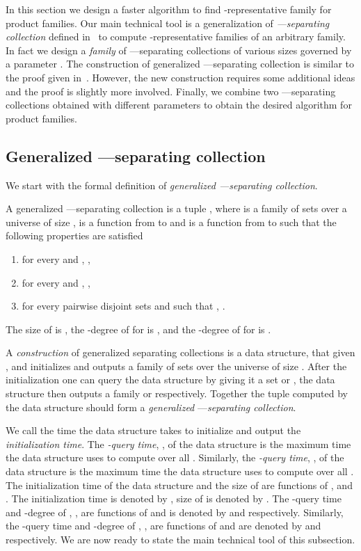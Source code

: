 



In this section we design a faster algorithm to find -representative family for product families. Our main technical tool is a generalization of {\em ---separating collection} defined in~\cite{FominLS13} to compute  -representative families of an arbitrary family. In fact we design a {\em family} of ---separating collections of various sizes governed by a parameter .  The construction of generalized ---separating collection  is similar to the proof given in~\cite{FominLS13}. However, the new construction  requires some additional ideas and the proof is slightly more involved. Finally, we combine two ---separating collections obtained with different parameters to obtain the desired algorithm for product families. 

\subsection{Generalized ---separating collection}

We start with the formal definition of {\em generalized ---separating collection}.

\begin{definition}
\label{def:twincollection}
A generalized ---separating collection  is a tuple , where  is a family of sets over a universe  of size ,  is a function from 
 to  and  is a function from  to  such that the following properties are satisfied
\begin{enumerate}
 \item for every  and , ,
 \item for every  and , , 
 \item for every pairwise disjoint sets  and  such that , 
.
\end{enumerate}
The size of   is , the -degree of  for  is , 
and the -degree of  for  is . 
\end{definition}




A {\em construction} of generalized separating collections is a data structure, that given ,  and  initializes and outputs a family  of sets over the universe  of size . 
After the initialization one can query the data structure by giving it a set   or , the data structure 
then outputs a family   or  respectively. Together the tuple  computed by the data structure 
should form a {\em generalized} ---{\em separating collection}.

We call the time the data structure takes to initialize and output  the {\em initialization time}. 
The {\em -query time}, , of the data structure is the maximum time the data structure uses to compute  over all . Similarly, the 
{\em -query time}, , of the data structure is the maximum time the data structure uses to compute  over all .
The initialization time of the data structure and the size of  are functions of  ,  and . The initialization time is denoted by 
, size of  is denoted by . The -query time and -degree of 
, , are functions of 
 and is denoted by  and  respectively. Similarly, the -query time and -degree of , ,  are functions of 
 and are denoted by  and  respectively.  
We are now ready to state the main technical  tool of this subsection.


